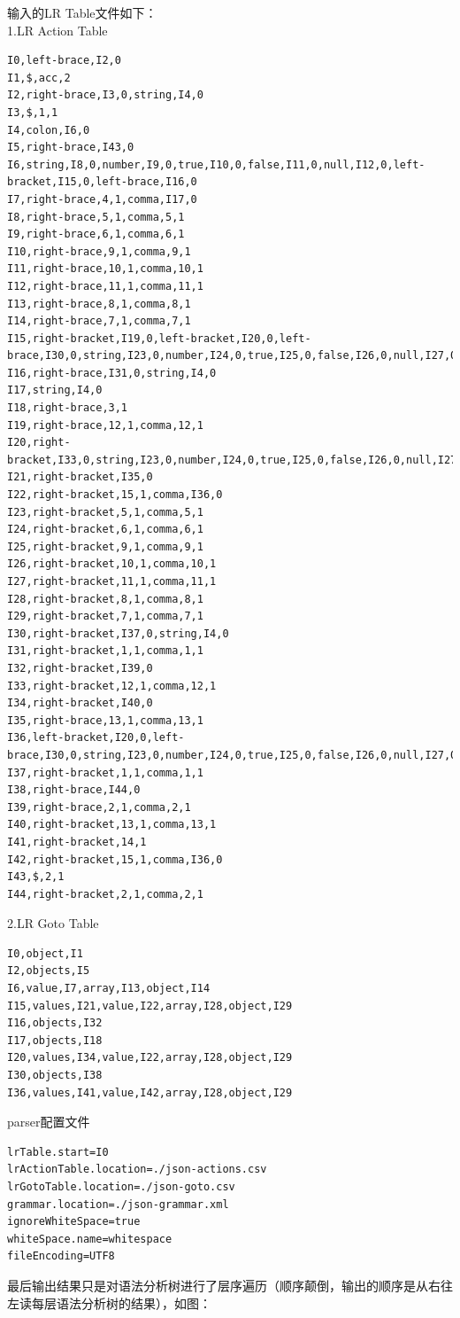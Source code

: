 输入的LR Table文件如下：\\
1.LR Action Table
\begin{lstlisting}
I0,left-brace,I2,0
I1,$,acc,2
I2,right-brace,I3,0,string,I4,0
I3,$,1,1
I4,colon,I6,0
I5,right-brace,I43,0
I6,string,I8,0,number,I9,0,true,I10,0,false,I11,0,null,I12,0,left-bracket,I15,0,left-brace,I16,0
I7,right-brace,4,1,comma,I17,0
I8,right-brace,5,1,comma,5,1
I9,right-brace,6,1,comma,6,1
I10,right-brace,9,1,comma,9,1
I11,right-brace,10,1,comma,10,1
I12,right-brace,11,1,comma,11,1
I13,right-brace,8,1,comma,8,1
I14,right-brace,7,1,comma,7,1
I15,right-bracket,I19,0,left-bracket,I20,0,left-brace,I30,0,string,I23,0,number,I24,0,true,I25,0,false,I26,0,null,I27,0
I16,right-brace,I31,0,string,I4,0
I17,string,I4,0
I18,right-brace,3,1
I19,right-brace,12,1,comma,12,1
I20,right-bracket,I33,0,string,I23,0,number,I24,0,true,I25,0,false,I26,0,null,I27,0
I21,right-bracket,I35,0
I22,right-bracket,15,1,comma,I36,0
I23,right-bracket,5,1,comma,5,1
I24,right-bracket,6,1,comma,6,1
I25,right-bracket,9,1,comma,9,1
I26,right-bracket,10,1,comma,10,1
I27,right-bracket,11,1,comma,11,1
I28,right-bracket,8,1,comma,8,1
I29,right-bracket,7,1,comma,7,1
I30,right-bracket,I37,0,string,I4,0
I31,right-bracket,1,1,comma,1,1
I32,right-bracket,I39,0
I33,right-bracket,12,1,comma,12,1
I34,right-bracket,I40,0
I35,right-brace,13,1,comma,13,1
I36,left-bracket,I20,0,left-brace,I30,0,string,I23,0,number,I24,0,true,I25,0,false,I26,0,null,I27,0
I37,right-bracket,1,1,comma,1,1
I38,right-brace,I44,0
I39,right-brace,2,1,comma,2,1
I40,right-bracket,13,1,comma,13,1
I41,right-bracket,14,1
I42,right-bracket,15,1,comma,I36,0
I43,$,2,1
I44,right-bracket,2,1,comma,2,1
\end{lstlisting}
2.LR Goto Table
\begin{lstlisting}
I0,object,I1
I2,objects,I5
I6,value,I7,array,I13,object,I14
I15,values,I21,value,I22,array,I28,object,I29
I16,objects,I32
I17,objects,I18
I20,values,I34,value,I22,array,I28,object,I29
I30,objects,I38
I36,values,I41,value,I42,array,I28,object,I29
\end{lstlisting}
parser配置文件
\begin{lstlisting}
lrTable.start=I0
lrActionTable.location=./json-actions.csv
lrGotoTable.location=./json-goto.csv
grammar.location=./json-grammar.xml
ignoreWhiteSpace=true
whiteSpace.name=whitespace
fileEncoding=UTF8
\end{lstlisting}
最后输出结果只是对语法分析树进行了层序遍历（顺序颠倒，输出的顺序是从右往左读每层语法分析树的结果），如图：\\
